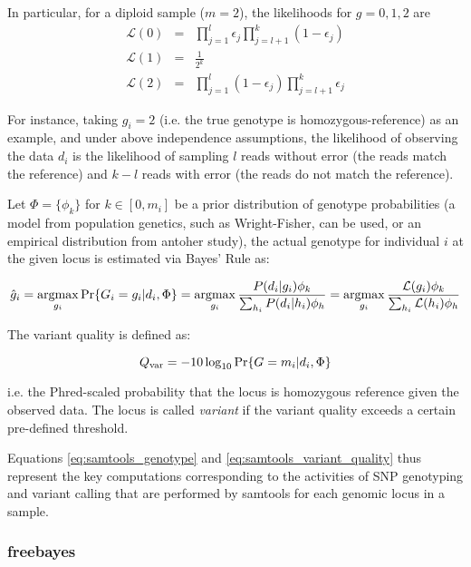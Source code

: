 In particular, for a diploid sample ($m=2$), the likelihoods for $g=0,1,2$ are
\begin{eqnarray}
    \label{samtools_diploid_genotype_likelihoods}
    \mathcal{L}(0)&=&\prod_{j=1}^l\epsilon_j\prod_{j=l+1}^k(1-\epsilon_j)\\
    \mathcal{L}(1)&=&\frac{1}{2^k}\\
    \mathcal{L}(2)&=&\prod_{j=1}^l(1-\epsilon_j)\prod_{j=l+1}^k\epsilon_j
\end{eqnarray}

For instance, taking $g_i = 2$ (i.e. the true genotype is homozygous-reference) as an example, and under above independence assumptions, the likelihood of observing the data $d_i$ is the likelihood of sampling $l$ reads without error (the reads match the reference) and $k-l$ reads with error (the reads do not match the reference).

Let $\Phi = \{\phi_k\}$ for $k \in [0,m_i]$ be a prior distribution of genotype probabilities (a model from population genetics, such as Wright-Fisher, can be used, or an empirical distribution from antoher study), the actual genotype for individual $i$ at the given locus is estimated via Bayes' Rule as:

\begin{equation}
    \label{eq:samtools_genotype}
    \hat{g}_i=\operatorname*{argmax}_{g_i} \Pr\{G_i=g_i|d_i,\Phi\}=\operatorname*{argmax}_{g_i}\frac{P(d_i|g_i)\phi_k}{\sum_{h_i}P(d_i|h_i)\phi_h}=\operatorname*{argmax}_{g_i}\frac{\mathcal{L}(g_i)\phi_k}{\sum_{h_i}\mathcal{L}(h_i)\phi_h}
\end{equation}

The variant quality is defined as:

\begin{equation}
    \label{eq:samtools_variant_quality}
    Q_{\rm var}=-10\log_{10}\Pr\{G=m_i|d_i,\Phi\}
\end{equation}

i.e. the Phred-scaled probability that the locus is homozygous reference given the observed data. The locus is called \emph{variant} if the variant quality exceeds a certain pre-defined threshold.

Equations \ref{eq:samtools_genotype} and \ref{eq:samtools_variant_quality} thus represent the key computations corresponding to the activities of SNP genotyping and variant calling that are performed by samtools for each genomic locus in a sample.

\subsubsection{freebayes}

